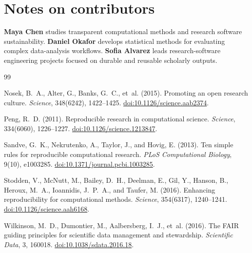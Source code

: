 \section*{Notes on contributors}

\textbf{Maya Chen} studies transparent computational methods and research
software sustainability. \textbf{Daniel Okafor} develops statistical methods
for evaluating complex data-analysis workflows. \textbf{Sofia Alvarez} leads
research-software engineering projects focused on durable and reusable scholarly
outputs.

\begin{thebibliography}{99}

Nosek, B.~A., Alter, G., Banks, G.~C., et~al. (2015).
Promoting an open research culture.
\emph{Science}, 348(6242), 1422--1425.
\href{https://doi.org/10.1126/science.aab2374}{doi:10.1126/science.aab2374}.

Peng, R.~D. (2011).
Reproducible research in computational science.
\emph{Science}, 334(6060), 1226--1227.
\href{https://doi.org/10.1126/science.1213847}{doi:10.1126/science.1213847}.

Sandve, G.~K., Nekrutenko, A., Taylor, J., and Hovig, E. (2013).
Ten simple rules for reproducible computational research.
\emph{PLoS Computational Biology}, 9(10), e1003285.
\href{https://doi.org/10.1371/journal.pcbi.1003285}{doi:10.1371/journal.pcbi.1003285}.

Stodden, V., McNutt, M., Bailey, D.~H., Deelman, E., Gil, Y., Hanson, B.,
Heroux, M.~A., Ioannidis, J.~P.~A., and Taufer, M. (2016).
Enhancing reproducibility for computational methods.
\emph{Science}, 354(6317), 1240--1241.
\href{https://doi.org/10.1126/science.aah6168}{doi:10.1126/science.aah6168}.

Wilkinson, M.~D., Dumontier, M., Aalbersberg, I.~J., et~al. (2016).
The FAIR guiding principles for scientific data management and stewardship.
\emph{Scientific Data}, 3, 160018.
\href{https://doi.org/10.1038/sdata.2016.18}{doi:10.1038/sdata.2016.18}.

\end{thebibliography}

\appendix
